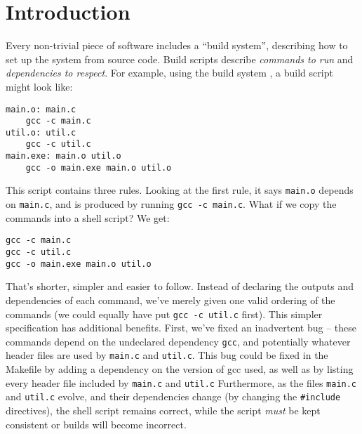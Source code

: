 \section{Introduction}
\label{sec:introduction}


Every non-trivial piece of software includes a ``build system'', describing how to set up the system from source code.
Build scripts \cite{build_systems_a_la_carte} describe \emph{commands to run} and \emph{dependencies to respect}. For example, using the \Make build system \cite{make}, a build script might look like:

\vspace{3mm}
\begin{small}
\begin{verbatim}
main.o: main.c
    gcc -c main.c
util.o: util.c
    gcc -c util.c
main.exe: main.o util.o
    gcc -o main.exe main.o util.o
\end{verbatim}
\end{small}
\vspace{3mm}

This script contains three rules. Looking at the first rule, it says \texttt{main.o} depends on \texttt{main.c}, and is produced by running \texttt{gcc -c main.c}. What if we copy the commands into a shell script? We get:

\vspace{3mm}
\begin{small}
\begin{verbatim}
gcc -c main.c
gcc -c util.c
gcc -o main.exe main.o util.o
\end{verbatim}
\end{small}
\vspace{3mm}

That's shorter, simpler and easier to follow. Instead of declaring the outputs and dependencies of each command, we've merely given one valid ordering of the commands (we could equally have put \texttt{gcc -c util.c} first). This simpler specification has additional benefits. First, we've fixed an inadvertent bug -- these commands depend on the undeclared dependency \texttt{gcc}, and potentially whatever header files are used by \texttt{main.c} and \texttt{util.c}.  This bug could be fixed in the Makefile by adding a dependency on the version of gcc used, as well as by listing every header file included by \texttt{main.c} and \texttt{util.c}
Furthermore, as the files \texttt{main.c} and \texttt{util.c} evolve, and their dependencies change (by changing the \texttt{\#include} directives), the shell script remains correct, while the \Make script \emph{must} be kept consistent or builds will become incorrect.

